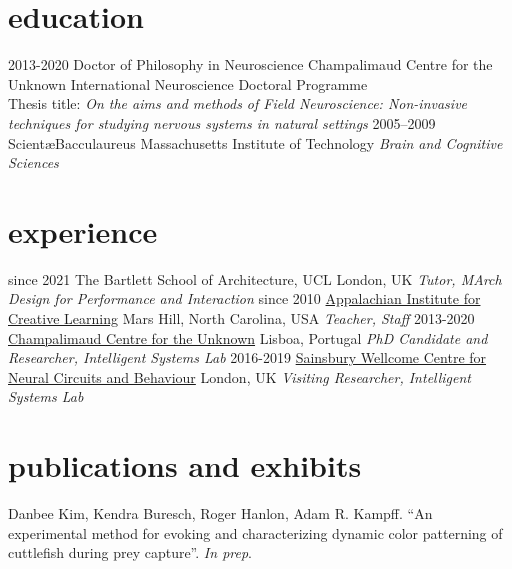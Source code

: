 \documentclass[]{friggeri-cv}
\begin{document}
\section{education}

\begin{entrylist}
  \entry
    {2013-2020}
    {Doctor of Philosophy in Neuroscience}
    {Champalimaud Centre for the Unknown}
    {International Neuroscience Doctoral Programme \\ Thesis title: \emph{On the aims and methods of Field Neuroscience: Non-invasive techniques for studying nervous systems in natural settings}}
  \entry
    {2005–2009}
    {Scient\ae Bacculaureus}
    {Massachusetts Institute of Technology}
	{\emph{Brain and Cognitive Sciences}}
\end{entrylist}

\section{experience}

\begin{entrylist}
  \entry
    {since 2021}
	{The Bartlett School of Architecture, UCL}
	{London, UK}
	{\emph{Tutor, MArch Design for Performance and Interaction}}
  \entry
    {since 2010}
    {\href{http://www.appalachianinstitute.org/}{Appalachian Institute for Creative Learning}}
    {Mars Hill, North Carolina, USA}
    {\emph{Teacher, Staff}}
  \entry
    {2013-2020}
    {\href{http://neuro.fchampalimaud.org/en/research/investigators/research-groups/group/Kampff/}{Champalimaud Centre for the Unknown}}
    {Lisboa, Portugal}
    {\emph{PhD Candidate and Researcher, Intelligent Systems Lab}}
  \entry
    {2016-2019}
    {\href{https://www.ucl.ac.uk/swc/}{Sainsbury Wellcome Centre for Neural Circuits and Behaviour}}
    {London, UK}
    {\emph{Visiting Researcher, Intelligent Systems Lab}}
\end{entrylist}

\section{publications and exhibits}

Danbee Kim, Kendra Buresch, Roger Hanlon, Adam R. Kampff. ``An experimental method for evoking and characterizing dynamic color patterning of cuttlefish during prey capture''. \emph{In prep}.
\end{document}
